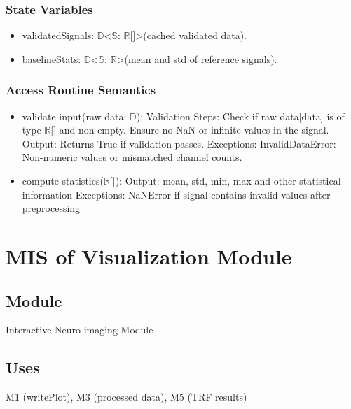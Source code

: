 \documentclass[12pt, titlepage]{article}
\begin{document}
\subsubsection{State Variables}
\begin{itemize}
\item validatedSignals: $\mathbb{D}$<$\mathbb{S}$: $\mathbb{R}$[]>(cached validated data).


\item baselineStats: $\mathbb{D}$<$\mathbb{S}$: $\mathbb{R}$>(mean and std of reference signals).


\end{itemize}

\subsubsection{Access Routine Semantics}
\begin{itemize}
  \item validate input(raw data: $\mathbb{D}$):
    \subitem Validation Steps:
        \subsubitem Check if raw data[data] is of type $\mathbb{R}$[] and non-empty.
        \subsubitem Ensure no NaN or infinite values in the signal.
    \subitem Output:
        \subsubitem Returns True if validation passes.
    \subitem Exceptions:
        \subsubitem InvalidDataError: Non-numeric values or mismatched channel counts.
    \item compute statistics($\mathbb{R}$[]):
    \subitem Output:
        \subsubitem mean, std, min, max and other statistical information
    \subitem Exceptions:
        \subsubitem NaNError if signal contains invalid values after preprocessing
\end{itemize}


\section{MIS of Visualization Module}

\subsection{Module}

Interactive Neuro-imaging Module
\subsection{Uses}

M1 (writePlot), M3 (processed data), M5 (TRF results)
\end{document}
